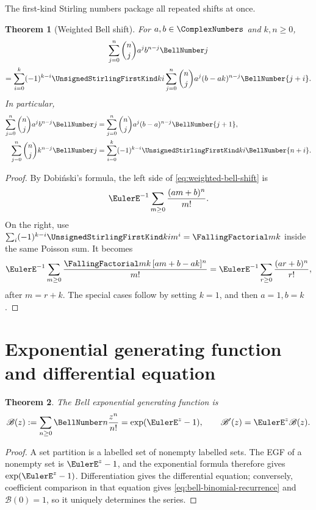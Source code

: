 \documentclass[11pt,a4paper,oneside,openany]{book}
\newtheorem{theorem}{Theorem}[chapter]
\theoremstyle{definition}
\theoremstyle{remark}
\begin{document}
The first-kind Stirling numbers package all repeated shifts at once.
\begin{theorem}[Weighted Bell shift]\label{thm:weighted-bell-shift}
For $a,b\in\ComplexNumbers$ and $k,n\ge0$,
\begin{multline}\label{eq:weighted-bell-shift}
 \sum_{j=0}^{n}\binom nj a^j b^{n-j}\BellNumber j\\
 =\sum_{i=0}^{k}(-1)^{k-i}\UnsignedStirlingFirstKind ki
   \sum_{j=0}^{n}\binom nj a^j(b-ak)^{n-j}\BellNumber{j+i}.
\end{multline}
In particular,
\begin{align}
 \sum_{j=0}^{n}\binom nj a^j b^{n-j}\BellNumber j
 &=\sum_{j=0}^{n}\binom nj a^j(b-a)^{n-j}\BellNumber{j+1},
 \label{eq:weighted-bell-k1}\\
 \sum_{j=0}^{n}\binom nj k^{n-j}\BellNumber j
 &=\sum_{i=0}^{k}(-1)^{k-i}\UnsignedStirlingFirstKind ki\BellNumber{n+i}.
 \label{eq:weighted-bell-special}
\end{align}
\end{theorem}
\begin{proof}
By Dobiński's formula, the left side of
\eqref{eq:weighted-bell-shift} is
\[
 \EulerE^{-1}\sum_{m\ge0}\frac{(am+b)^n}{m!}.
\]
On the right, use
$\sum_i(-1)^{k-i}\UnsignedStirlingFirstKind ki m^i=\FallingFactorial mk$ inside the same Poisson sum.  It
becomes
\[
 \EulerE^{-1}\sum_{m\ge0}\frac{\FallingFactorial mk\,[a m+b-ak]^n}{m!}
 =\EulerE^{-1}\sum_{r\ge0}\frac{(ar+b)^n}{r!},
\]
after $m=r+k$.  The special cases follow by setting $k=1$, and then $a=1,b=k$.
\end{proof}

\section{Exponential generating function and differential equation}
\begin{theorem}\label{thm:bell-egf}
The Bell exponential generating function is
\begin{equation}\label{eq:bell-egf}
 \mathscr B(z):=\sum_{n\ge0}\BellNumber n\frac{z^n}{n!}
 =\exp(\EulerE^z-1),
 \qquad
 \mathscr B'(z)=\EulerE^z\mathscr B(z).
\end{equation}
\end{theorem}
\begin{proof}
A set partition is a labelled set of nonempty labelled sets.  The EGF of a
nonempty set is $\EulerE^z-1$, and the exponential formula therefore gives
$\exp(\EulerE^z-1)$.  Differentiation gives the differential equation; conversely,
coefficient comparison in that equation gives
\eqref{eq:bell-binomial-recurrence} and $\mathscr B(0)=1$, so it uniquely determines
the series.
\end{proof}
\end{document}
